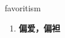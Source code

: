 
\begin{frame}
{\huge favoritism}
\begin{center}
\begin{enumerate}\Large
  \item \textbf{偏爱，偏袒}
\end{enumerate}
\end{center}
\end{frame}
